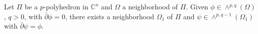 
Let $\Pi$ be a $p$-polyhedron in $\mathbb{C}^n$ and $\Omega$ a neighborhood of $\Pi$. Given $\phi \in \wedge^{p,q}(\Omega)$, $q > 0$, with $\bar{\partial}\phi = 0$, there exists a neighborhood $\Omega_1$ of $\Pi$ and $\psi \in \wedge^{p,q-1}(\Omega_1)$ with $\bar{\partial}\psi = \phi$.
